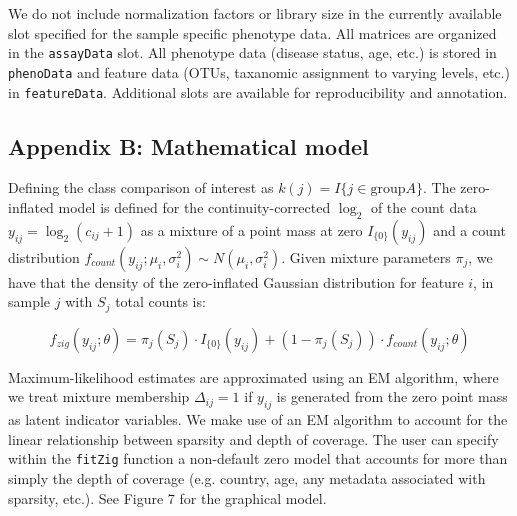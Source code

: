 \documentclass[a4paper,11pt]{article}\usepackage[]{graphicx}\usepackage[]{color}
\begin{document}
We do not include normalization factors or library size in the currently available slot specified for the sample specific phenotype data. All matrices are organized in the \texttt{assayData} slot. All phenotype data (disease status, age, etc.) is stored in \texttt{phenoData} and feature data (OTUs, taxanomic assignment to varying levels, etc.) in \texttt{featureData}. Additional slots are available for reproducibility and annotation.

\subsection{Appendix B: Mathematical model}

Defining the class comparison of interest as $k(j)=I\{j \in \mathrm{ group } A\}$. The zero-inflated model is defined for the continuity-corrected $\log_2$ of the count data $y_{ij} = \log_2(c_{ij}+1)$ as a mixture of a point mass at zero $I_{\{0\}}(y_{ij})$ and a count distribution $f_{count}(y_{ij};\mu_i, \sigma_i^2) \sim N(\mu_i, \sigma_i^2)$.
Given mixture parameters $\pi_{j}$, we have that the density of the zero-inflated Gaussian distribution for feature $i$, in sample $j$ with $S_{j}$ total counts is:

\begin{equation}
f_{zig}(y_{ij}; \theta ) = \pi_{j}(S_{j}) \cdot I_{\{0\}}(y_{ij})
+ (1-\pi_{j}(S_{j})) \cdot f_{count}(y_{ij};\theta)
\end{equation}

Maximum-likelihood estimates are approximated using an EM algorithm,
where we treat mixture membership $\Delta_{ij}=1$ if $y_{ij}$ is
generated from the zero point mass as latent indicator variables\cite{EM}. We make use of an EM algorithm to account for the linear relationship between sparsity and depth of coverage. The user can specify within the \texttt{fitZig} function a non-default zero model that accounts for more than simply the depth of coverage (e.g. country, age, any metadata associated with sparsity, etc.).
See Figure 7 for the graphical model.
\end{document}

